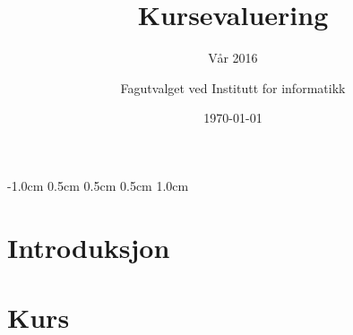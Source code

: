 \documentclass[norsk,a4paper,11pt]{report}
\author{Fagutvalget ved Institutt for informatikk}
\title{Kursevaluering}
\subtitle{Vår 2016}
\date{\today}
\begin{document}
\ififorside{}

\setlength{\topmargin}		{-1.0cm}
\setlength{\headsep}		{0.5cm}
\setlength{\oddsidemargin}	{0.5cm}
\setlength{\evensidemargin}	{0.5cm}
\setlength{\footskip}		{1.0cm}
\renewcommand{\thesection}{}
\renewcommand{\thesubsection}{}
\tableofcontents
\newpage
\chapter{Introduksjon}
\newpage
\chapter{Kurs}
\newpage
\end{document}
